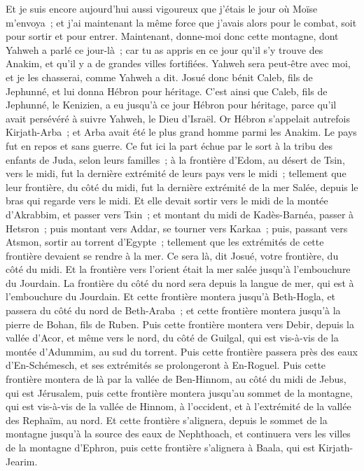 \begin{multicols}{2}
Et je suis encore aujourd'hui aussi vigoureux que j'étais le jour où Moïse m'envoya~; et j'ai maintenant la même force que j'avais alors pour le combat, soit pour sortir et pour entrer.
Maintenant, donne-moi donc cette montagne, dont Yahweh a parlé ce jour-là~; car tu as appris en ce jour qu'il s'y trouve des Anakim, et qu'il y a de grandes villes fortifiées. Yahweh sera peut-être avec moi, et je les chasserai, comme Yahweh a dit.
Josué donc bénit Caleb, fils de Jephunné, et lui donna Hébron pour héritage.
C'est ainsi que Caleb, fils de Jephunné, le Kenizien, a eu jusqu'à ce jour Hébron pour héritage, parce qu'il avait persévéré à suivre Yahweh, le Dieu d'Israël.
Or Hébron s'appelait autrefois Kirjath-Arba~; et Arba avait été le plus grand homme parmi les Anakim. Le pays fut en repos et sans guerre.
\VerseOne{} Ce fut ici la part échue par le sort à la tribu des enfants de Juda, selon leurs familles~; à la frontière d'Edom, au désert de Tsin, vers le midi, fut la dernière extrémité de leurs pays vers le midi~;
tellement que leur frontière, du côté du midi, fut la dernière extrémité de la mer Salée, depuis le bras qui regarde vers le midi. 
Et elle devait sortir vers le midi de la montée d'Akrabbim, et passer vers Tsin~; et montant du midi de Kadès-Barnéa, passer à Hetsron~; puis montant vers Addar, se tourner vers Karkaa~; 
puis, passant vers Atsmon, sortir au torrent d'Egypte~; tellement que les extrémités de cette frontière devaient se rendre à la mer. Ce sera là, dit Josué, votre frontière, du côté du midi.
Et la frontière vers l'orient était la mer salée jusqu'à l'embouchure du Jourdain. La frontière du côté du nord sera depuis la langue de mer, qui est à l'embouchure du Jourdain.
Et cette frontière montera jusqu'à Beth-Hogla, et passera du côté du nord de Beth-Araba~; et cette frontière montera jusqu'à la pierre de Bohan, fils de Ruben.
Puis cette frontière montera vers Debir, depuis la vallée d'Acor, et même vers le nord, du côté de Guilgal, qui est vis-à-vis de la montée d'Adummim, au sud du torrent. Puis cette frontière passera près des eaux d'En-Schémesch, et ses extrémités se prolongeront à En-Roguel.
Puis cette frontière montera de là par la vallée de Ben-Hinnom, au côté du midi de Jebus, qui est Jérusalem, puis cette frontière montera jusqu'au sommet de la montagne, qui est vis-à-vis de la vallée de Hinnom, à l'occident, et à l'extrémité de la vallée des Rephaïm, au nord.
Et cette frontière s'alignera, depuis le sommet de la montagne jusqu'à la source des eaux de Nephthoach, et continuera vers les villes de la montagne d'Ephron, puis cette frontière s'alignera à Baala, qui est Kirjath-Jearim.

\end{multicols}
